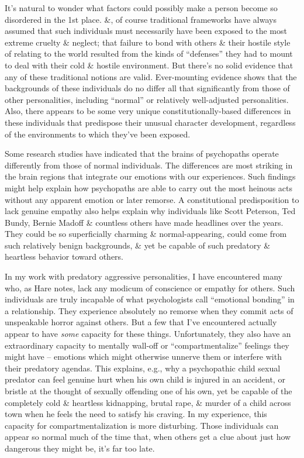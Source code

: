 \documentclass{article}
\numberwithin{equation}{section}
\begin{document}
It's natural to wonder what factors could possibly make a person become so disordered in the 1st place. \&, of course traditional frameworks have always assumed that such individuals must necessarily have been exposed to the most extreme cruelty \& neglect; that failure to bond with others \& their hostile style of relating to the world resulted from the kinds of ``defenses'' they had to mount to deal with their cold \& hostile environment. But there's no solid evidence that any of these traditional notions are valid. Ever-mounting evidence shows that the backgrounds of these individuals do no differ all that significantly from those of other personalities, including ``normal'' or relatively well-adjusted personalities. Also, there appears to be some very unique constitutionally-based differences in these individuals that predispose their unusual character development, regardless of the environments to which they've been exposed.

Some research studies have indicated that the brains of psychopaths operate differently from those of normal individuals. The differences are most striking in the brain regions that integrate our emotions with our experiences. Such findings might help explain how psychopaths are able to carry out the most heinous acts without any apparent emotion or later remorse. A constitutional predisposition to lack genuine empathy also helps explain why individuals like Scott Peterson, Ted Bundy, Bernie Madoff \& countless others have made headlines over the years. They could be so superficially charming \& normal-appearing, could come from such relatively benign backgrounds, \& yet be capable of such predatory \& heartless behavior toward others.

In my work with predatory aggressive personalities, I have encountered many who, as Hare notes, lack any modicum of conscience or empathy for others. Such individuals are truly incapable of what psychologists call ``emotional bonding'' in a relationship. They experience absolutely no remorse when they commit acts of unspeakable horror against others. But a few that I've encountered actually appear to have \textit{some} capacity for these things. Unfortunately, they also have an extraordinary capacity to mentally wall-off or ``compartmentalize'' feelings they might have -- emotions which might otherwise unnerve them or interfere with their predatory agendas. This explains, e.g., why a psychopathic child sexual predator can feel genuine hurt when his own child is injured in an accident, or bristle at the thought of sexually offending one of his own, yet be capable of the completely cold \& heartless kidnapping, brutal rape, \& murder of a child across town when he feels the need to satisfy his craving. In my experience, this capacity for compartmentalization is more disturbing. Those individuals can appear so normal much of the time that, when others get a clue about just how dangerous they might be, it's far too late.
\end{document}
